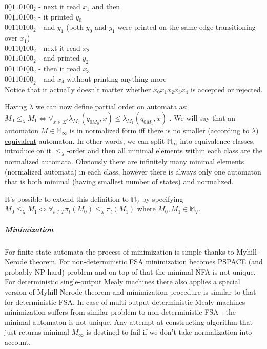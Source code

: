 \documentclass[12pt]{article}
\begin{document}
$0\underline{0}110100_2$ - next it read $x_1$ and then \\
$00\underline{1}10100_2$ - it printed $y_0$ \\
$001\underline{1}0100_2$ - and $y_1$ (both $y_0$ and $y_1$ were printed on the same edge transitioning over $x_1$)\\
$0011\underline{0}100_2$ - next it read $x_2$\\
$00110\underline{1}00_2$ - and printed $y_2$ \\
$001101\underline{0}0_2$ - then it read $x_3$ \\
$0011010\underline{0}_2$ - and $x_4$ without printing anything more \\
Notice that it actually doesn't matter whether $x_0x_1x_2x_3x_4$ is accepted or rejected. 

Having $\lambda$ we can now define partial order on automata as: \\ 
$M_0 \le_{\lambda} M_1 \iff \forall_{x\in\Sigma^*} \lambda_{M_0}(q_{0M_0},x) \le \lambda_{M_1}(q_{0M_1},x)$ . We will say that an automaton $M\in\mathbb{M}_\infty$ is in normalized form iff there is no smaller (according to $\lambda$) \underline{equivalent} automaton. In other words, we can split $\mathbb{ M}_\infty$ into equivalence classes, introduce on it $\le_\lambda$-order and then all minimal elements within each class are the normalized automata. Obviously there are infinitely many minimal elements (normalized automata) in each class, however there is always  only one automaton that is both minimal (having smallest number of states) and normalized.

It's possible to extend this definition to $\mathbb{ M}_\vee$ by specifying \\ $M_0 \le_{\lambda} M_1  \iff \forall_{t\in T} \pi_t(M_0) \le_{\lambda} \pi_t(M_1)$ where $M_0,M_1\in \mathbb{ M}_\vee$.



\subparagraph{Minimization} For finite state automata the process of minimization is simple thanks to Myhill-Nerode theorem. For non-deterministic FSA minimization becomes PSPACE (and probably NP-hard) problem and on top of that the minimal NFA is not unique. For deterministic single-output Mealy machines there also applies a special version of Myhill-Nerode theorem and minimization procedure is similar to that for deterministic FSA. In case of multi-output deterministic Mealy machines minimization suffers from similar problem to non-deterministic FSA - the minimal automaton is not unique. Any attempt at constructing algorithm that just returns minimal $M_\infty$ is destined to fail if we don't take normalization into account. 
\end{document}
